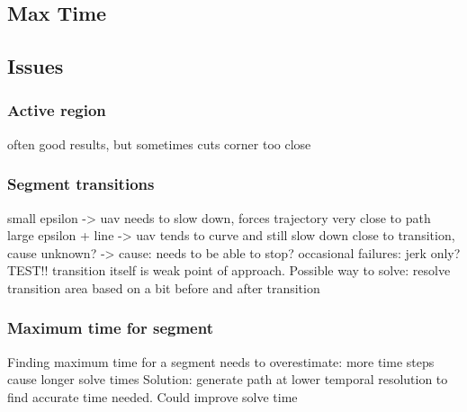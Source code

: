 \subsection{Max Time}

\subsection{Issues}

\subsubsection{Active region}
often good results, but sometimes cuts corner too close

\subsubsection{Segment transitions}
small epsilon -> uav needs to slow down, forces trajectory very close to path
large epsilon + line -> uav tends to curve and still slow down close to transition, cause unknown?
						-> cause: needs to be able to stop?                        
occasional failures: jerk only? TEST!!
transition itself is weak point of approach. Possible way to solve: resolve transition area based on a bit before and after transition

\subsubsection{Maximum time for segment}
Finding maximum time for a segment needs to overestimate: more time steps cause longer solve times
Solution: generate path at lower temporal resolution to find accurate time needed. Could improve solve time







